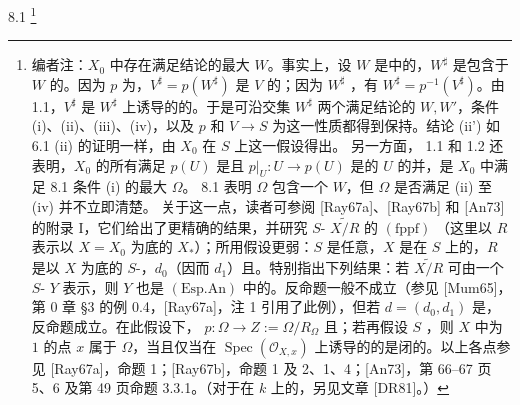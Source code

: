 \begin{SGAresult}{}{8.1}
\footnote{编者注：$X_0$ 中存在满足结论的最大 $W$。事实上，设 $W$ 是中的，$W^\sharp$ 是包含于 $W$ 的。因为 $p$ 为，$V^\sharp=p(W^\sharp)$ 是 $V$ 的；因为 $W^\sharp$ ，有 $W^\sharp=p^{-1}(V^\sharp)$。由 1.1，$V^\sharp$ 是 $W^\sharp$ 上诱导的的。于是可沿交集 $W^\sharp$ 两个满足结论的 $W,W'$，条件 (i)、(ii)、(iii)、(iv)，以及 $p$ 和 $V\to S$ 为这一性质都得到保持。结论 (ii') 如 6.1 (ii) 的证明一样，由 $X_0$ 在 $S$ 上这一假设得出。
另一方面， 1.1 和 1.2 还表明，$X_0$ 的所有满足 $p(U)$ 是且 $p|_U:U\to p(U)$ 是的 $U$ 的并，是 $X_0$ 中满足 8.1 条件 (i) 的最大 $\Omega$。 8.1 表明 $\Omega$ 包含一个 $W$，但 $\Omega$ 是否满足 (ii) 至 (iv) 并不立即清楚。
关于这一点，读者可参阅 [Ray67a]、[Ray67b] 和 [An73] 的附录 I，它们给出了更精确的结果，并研究 $S$- $\widetilde{X/R}$ 的 $(\mathrm{fppf})$ （这里以 $R$ 表示以 $X=X_0$ 为底的 $X_*$）；所用假设更弱：$S$ 是任意，$X$ 是在 $S$ 上的，$R$ 是以 $X$ 为底的 $S$-，$d_0$（因而 $d_1$）且。特别指出下列结果：若 $\widetilde{X/R}$ 可由一个 $S$- $Y$ 表示，则 $Y$ 也是 $(\mathrm{Esp.An})$ 中的。反命题一般不成立（参见 [Mum65]，第 0 章 \S 3 的例 0.4，[Ray67a]，注 1 引用了此例），但若 $d=(d_0,d_1)$ 是，反命题成立。在此假设下， $p:\Omega\to Z:=\Omega/R_\Omega$ 且；若再假设 $S$ ，则 $X$ 中为 $1$ 的点 $x$ 属于 $\Omega$，当且仅当在 $\operatorname{Spec}(\mathcal O_{X,x})$ 上诱导的的是闭的。以上各点参见 [Ray67a]，命题 1；[Ray67b]，命题 1 及 2、1、4；[An73]，第 66--67 页 5、6 及第 49 页命题 3.3.1。（对于在 $k$ 上的，另见文章 [DR81]。）}

\end{SGAresult}

